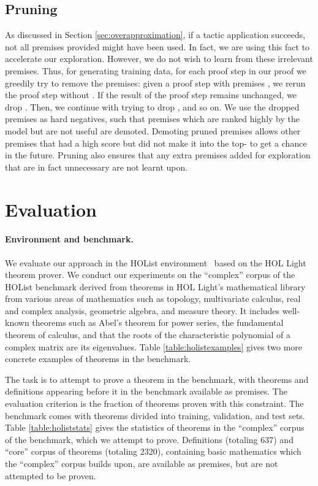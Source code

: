 \documentclass{article}
\begin{document}
\subsection{Pruning}
\label{sec:pruning}
As discussed in Section \ref{sec:overapproximation}, if a tactic application succeeds, not all premises provided might have been used. In fact, we are using this fact to accelerate our exploration.
However, we do not wish to learn from these irrelevant premises. Thus, 
for generating training data, for each proof step in our proof we greedily try to remove the premises: given a proof step with premises
, we rerun the proof step without .
If the result of the proof step remains unchanged, we drop . Then, we continue with trying to drop , and so on.
We use the dropped premises as hard negatives, such that premises which are ranked highly by the model but are not useful are demoted.
Demoting pruned premises allows other premises that had a high score but did not make it into the top- to get a chance in the future.
Pruning also ensures that any extra premises added for exploration that are in fact unnecessary are not learnt upon.






\section{Evaluation}
\label{sec:results}
\paragraph{Environment and benchmark.}
We evaluate our approach in the HOList environment~\citep{bansal2019holist} based on the HOL Light~\citep{Harrison96} theorem prover.
We conduct our experiments on the ``complex'' corpus of the HOList benchmark derived from theorems in HOL Light's mathematical library from various areas of mathematics such as topology, multivariate calculus, real and complex analysis, geometric algebra, and measure theory.
It includes well-known theorems such as Abel's theorem for power series, the fundamental theorem of calculus, and that the roots of the characteristic polynomial of a complex matrix are its eigenvalues. Table \ref{table:holistexamples} gives two more concrete examples of theorems in the benchmark.

The task is to attempt to prove a theorem in the benchmark, with theorems and definitions
appearing before it in the benchmark available as premises.
The evaluation criterion is the fraction of theorems proven with this constraint.
The benchmark comes with theorems divided into training, validation, and test sets.
Table \ref{table:holiststats} gives the statistics of theorems in the ``complex'' corpus of the benchmark, which we attempt to prove. Definitions (totaling 637) and ``core'' corpus of theorems (totaling 2320), containing basic mathematics which the ``complex'' corpus builds upon, are available as premises, but are not attempted to be proven.
\end{document}
